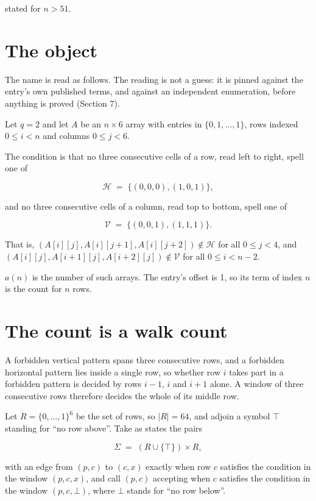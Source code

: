 \documentclass[11pt]{article}
\theoremstyle{definition}
\begin{document}
stated for $n > 51$.

\section{The object}

The name is read as follows. The reading is not a guess: it is pinned against the entry's own published terms, and against an independent enumeration, before anything is proved (Section 7).

Let $q = 2$ and let $A$ be an $n \times 6$ array with entries in $\{0,1,\dots,1\}$, rows indexed $0 \le i < n$ and columns $0 \le j < 6$.

The condition is that no three consecutive cells of a row, read left to right, spell one of

\[\mathcal{H} \;=\; \{(0,0,0), (1,0,1)\},\]

and no three consecutive cells of a column, read top to bottom, spell one of

\[\mathcal{V} \;=\; \{(0,0,1), (1,1,1)\}.\]

That is, $(A[i][j],A[i][j{+}1],A[i][j{+}2]) \notin \mathcal{H}$ for all $0 \le j < 4$, and $(A[i][j],A[i{+}1][j],A[i{+}2][j]) \notin \mathcal{V}$ for all $0 \le i < n-2$.

$a(n)$ is the number of such arrays. The entry's offset is 1, so its term of index $n$ is the count for $n$ rows.

\section{The count is a walk count}

A forbidden vertical pattern spans three consecutive rows, and a forbidden horizontal pattern lies inside a single row, so whether row $i$ takes part in a forbidden pattern is decided by rows $i-1$, $i$ and $i+1$ alone. A window of three consecutive rows therefore decides the whole of its middle row.

Let $R = \{0,\dots,1\}^{6}$ be the set of rows, so $|R| = 64$, and adjoin a symbol $\top$ standing for ``no row above''. Take as states the pairs

\[\Sigma \;=\; (R \cup \{\top\}) \times R,\]

with an edge from $(p,c)$ to $(c,x)$ exactly when row $c$ satisfies the condition in the window $(p,c,x)$, and call $(p,c)$ accepting when $c$ satisfies the condition in the window $(p,c,\bot)$, where $\bot$ stands for ``no row below''.
\end{document}
